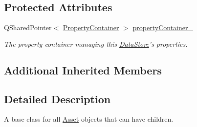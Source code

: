 \subsection*{Protected Attributes}
\begin{DoxyCompactItemize}
\item 
\hypertarget{class_picto_1_1_data_store_af50c0cd3df239ba86be9edc72ded3ccf}{Q\-Shared\-Pointer$<$ \hyperlink{class_picto_1_1_property_container}{Property\-Container} $>$ \hyperlink{class_picto_1_1_data_store_af50c0cd3df239ba86be9edc72ded3ccf}{property\-Container\-\_\-}}\label{class_picto_1_1_data_store_af50c0cd3df239ba86be9edc72ded3ccf}

\begin{DoxyCompactList}\small\item\em The property container managing this \hyperlink{class_picto_1_1_data_store}{Data\-Store}'s properties. \end{DoxyCompactList}\end{DoxyCompactItemize}
\subsection*{Additional Inherited Members}


\subsection{Detailed Description}
A base class for all \hyperlink{class_picto_1_1_asset}{Asset} objects that can have children. 

